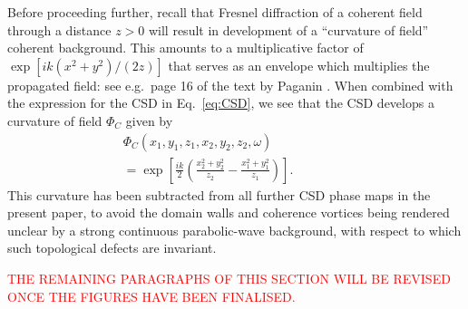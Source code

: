 \documentclass[%
 reprint,
 amsmath,amssymb,
 aps,
]{revtex4-1}
\begin{document}
% 

Before proceeding further, recall that Fresnel diffraction of a coherent field through a distance $z>0$ will result in development of a ``curvature of field'' coherent background.  This  amounts to a multiplicative factor of $\exp[ik(x^2+y^2)/(2z)]$ that serves as an envelope which multiplies the propagated field: see e.g.~page 16 of the text by Paganin \cite{paganin_book}.  When combined with the expression for the CSD in Eq.~\ref{eq:CSD}, we see that the CSD develops a curvature of field $\Phi_C$ given by
%
\begin{eqnarray}
\nonumber\Phi_C(x_1,y_1,z_1,x_2,y_2,z_2,\omega) \quad\quad\quad\quad\quad\quad \\ =\exp\left[\frac{ik}{2}\left(\frac{x_2^2+y_2^2}{z_2}-\frac{x_1^2+y_1^2}{z_1}\right)\right].    
\label{eq:CSD-curvature-of-field}
\end{eqnarray}
%
This curvature has been subtracted from all further CSD phase maps in the present paper, to avoid the domain walls and coherence vortices being rendered unclear by a strong continuous parabolic-wave background, with respect to which such topological defects are invariant.    

\textcolor{red}{THE REMAINING PARAGRAPHS OF THIS SECTION WILL BE REVISED ONCE THE FIGURES HAVE BEEN FINALISED.}
\end{document}
